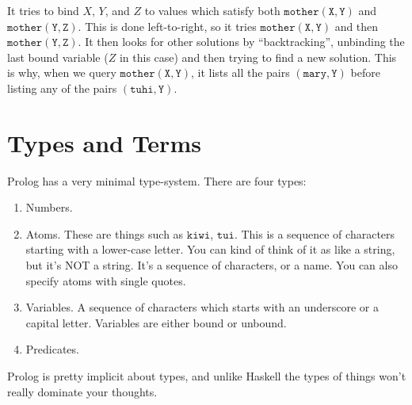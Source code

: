 \documentclass[a4paper,12pt]{article}
\newcommand{\kwa}[1]{\mathtt{#1}}
\begin{document}
\noindent
It tries to bind $X$, $Y$, and $Z$ to values which satisfy both $\kwa{mother(X,Y)}$ and $\kwa{mother(Y,Z)}$. This is done left-to-right, so it tries $\kwa{mother(X,Y)}$ and then $\kwa{mother(Y,Z)}$. It then looks for other solutions by ``backtracking'', unbinding the last bound variable ($Z$ in this case) and then trying to find a new solution. This is why, when we query $\kwa{mother(X, Y)}$, it lists all the pairs $\kwa{(mary, Y)}$ before listing any of the pairs $\kwa{(tuhi, Y)}$.

\section{Types and Terms}

\noindent
Prolog has a very minimal type-system. There are four types:
\noindent
\begin{enumerate}
  \setlength{\itemsep}{0pt}
	\item Numbers.
	\item Atoms. These are things such as $\kwa{kiwi}$, $\kwa{tui}$. This is a sequence of characters starting with a lower-case letter. You can kind of think of it as like a string, but it's NOT a string. It's a sequence of characters, or a name. You can also specify atoms with single quotes.
	\item Variables. A sequence of characters which starts with an underscore or a capital letter. Variables are either bound or unbound.
	\item Predicates.
\end{enumerate}

\noindent
Prolog is pretty implicit about types, and unlike Haskell the types of things won't really dominate your thoughts.
\end{document}
